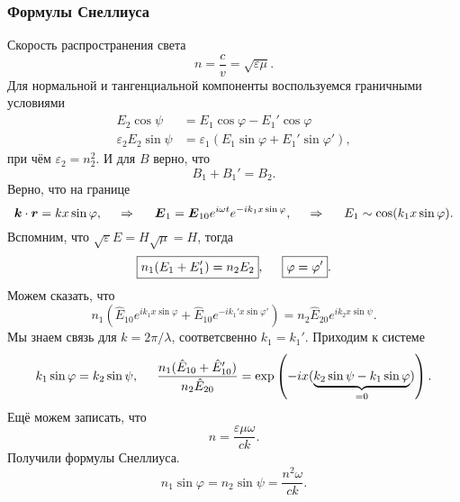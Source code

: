 \subsubsection*{Формулы Снеллиуса}

Скорость распространения света
\begin{equation*}
    n = \frac{c}{v} = \sqrt{\varepsilon \mu}.
\end{equation*}
Для нормальной и тангенциальной компоненты воспользуемся граничными условиями
\begin{align*}
    E_2 \cos \psi &= E_1 \cos \varphi - E_1' \cos \varphi \\
    \varepsilon_2 E_2 \sin \psi &= \varepsilon_1 \left(
        E_1 \sin \varphi + E_1' \sin \varphi'
    \right),
\end{align*}
при чём $\varepsilon_2 = n_2^2$. И для $B$ верно, что
\begin{equation*}
    B_1 + B_1' = B_2.
\end{equation*}
Верно, что на границе
\begin{equation*}
    \mbox{\boldmath $k$} \cdot \mbox{\boldmath $r$} = k x \sin \varphi,
    \hspace{0.5cm} \Rightarrow \hspace{0.5cm} 
    \mbox{\boldmath $E$}_1 = \mbox{\boldmath $E$}_{10} e^{i\omega t} e^{-ik_1 x \sin \varphi},
    \hspace{0.5cm} \Rightarrow \hspace{0.5cm} 
    E_1 \sim \cos (k_1 x \sin \varphi).
\end{equation*}
Вспомним, что $\sqrt{\varepsilon} E = H \sqrt{\mu} = H$, тогда
\begin{equation*}
    \boxed{n_1 (E_1 + E_1') = n_2 E_2}, \hspace{0.5cm} 
    \boxed{
        \varphi = \varphi'
    }.
\end{equation*}
Можем сказать, что
\begin{equation*}
    n_1 \left(
        \hat{E}_{10} e^{ik_1 x\sin \varphi} + \hat{E}_{10} e^{-ik_1' x \sin \varphi' }
    \right) = 
    n_2 \hat{E}_{20} e^{i k_2 x \sin \psi}.
\end{equation*}
Мы знаем связь для $k = 2\pi / \lambda$, соответсвенно $k_1 = k_1'$.  Приходим к системе
\begin{equation*}
        k_1 \sin \varphi = k_2 \sin \psi, \hspace{0.5cm} 
    \frac{n_1 (\hat{E}_{10} + \hat{E}_{10}')}{n_2 \hat{E}_{20}} = \exp\left(
        -ix(
        \underbrace{k_2 \sin \psi - k_1 \sin \varphi}_{=0}
        )
    \right).
\end{equation*}
Ещё можем записать, что
\begin{equation*}
    n = \frac{\varepsilon \mu \omega}{c k}.
\end{equation*}
Получили формулы Снеллиуса.
\begin{equation*}
    \boxed{
        n_1 \sin \varphi = n_2 \sin \psi = \frac{n^2 \omega}{ck} .
    }
\end{equation*}


